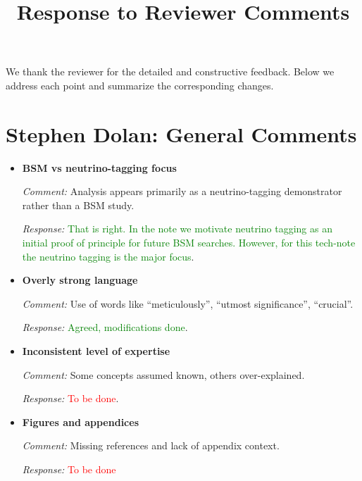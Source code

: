 \documentclass[11pt]{article}
\title{\textbf{Response to Reviewer Comments}}
\date{}
\begin{document}
\maketitle

We thank the reviewer for the detailed and constructive feedback. Below we address each point and summarize the corresponding changes.

\vspace{0.5cm}

\section*{Stephen Dolan: General Comments}

\begin{itemize}[leftmargin=*]

\item \textbf{BSM vs neutrino-tagging focus}

\textit{Comment:} Analysis appears primarily as a neutrino-tagging demonstrator rather than a BSM study.

\textit{Response:} \textcolor{green}{That is right. In the note we motivate neutrino tagging as an initial proof of principle for future BSM searches. However, for this tech-note the neutrino tagging is the major focus}.



\item \textbf{Overly strong language}

\textit{Comment:} Use of words like ``meticulously'', ``utmost significance'', ``crucial''.

\textit{Response:} \textcolor{green}{Agreed, modifications done}.



\item \textbf{Inconsistent level of expertise}

\textit{Comment:} Some concepts assumed known, others over-explained.

\textit{Response:} \textcolor{red}{To be done}.




\item \textbf{Figures and appendices}

\textit{Comment:} Missing references and lack of appendix context.

\textit{Response:} \textcolor{red}{To be done}

\end{itemize}
\end{document}
